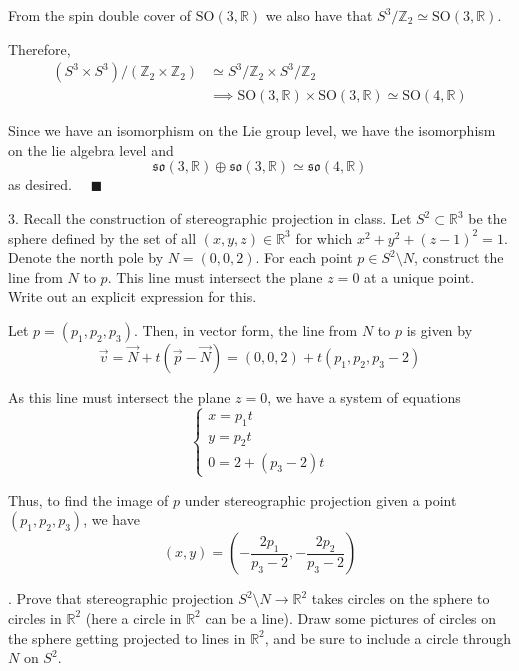 \documentclass[12pt]{article}
\newcommand{\Z}{\mathbb{Z}}
\newcommand{\R}{\mathbb{R}}
\newcommand{\SO}{\text{SO}}
\newcommand{\lra}{\longrightarrow}
\newcommand{\so}{\mathfrak{so}}
\newcommand{\qed}{\quad \blacksquare}
\begin{document}
        From the spin double cover of $\SO(3, \R)$ we also have that $S^3/\Z_2 \simeq \SO(3, \R)$. 

        Therefore, 
        \begin{align*}
            (S^3 \times S^3)/(\Z_2 \times \Z_2) &\simeq S^3/\Z_2 \times S^3/\Z_2 \\ 
            &\implies \SO(3, \R) \times \SO(3, \R) \simeq \SO(4, \R)
        \end{align*}        

        Since we have an isomorphism on the Lie group level, we have the isomorphism on the lie algebra level and 
        \[\so(3, \R) \oplus \so(3, \R) \simeq \so(4, \R)\]
        as desired. $\qed$
    \color{black}

\pagebreak 


3.  Recall the construction of stereographic projection in class.  Let $S^{2} \subset \R^{3}$ be the sphere defined by the set of all $(x,y,z) \in \R^{3}$ for which $x^{2} + y^{2} + (z-1)^{2} = 1$.  Denote the north pole by $N = (0,0,2)$.  For each point $p \in S^{2}\setminus N$, construct the line from $N$ to $p$.  This line must intersect the plane $z = 0$ at a unique point.  Write out an explicit expression for this. 

        \color{blue}
            Let $p = (p_1, p_2, p_3)$. Then, in vector form, the line from $N$ to $p$ is given by
            \[\vec v = \vec N + t(\vec p - \vec N) = (0, 0, 2) + t(p_1, p_2, p_3 - 2)\]

            As this line must intersect the plane $z = 0$, we have a system of equations 
            \[\begin{cases}
                x = p_1 t\\ 
                y = p_2 t\\ 
                0 = 2 + (p_3 - 2)t 
            \end{cases}\] 

            Thus, to find the image of $p$ under stereographic projection given a point $(p_1, p_2, p_3)$, we have 
            \[\boxed{(x, y) = \left(-\frac{2p_1}{p_3 - 2}, -\frac{2p_2}{p_3 - 2}\right)}\]
        \color{black}


.  Prove that stereographic projection $S^{2}\setminus N \lra \R^{2}$ takes circles on the sphere to circles in $\R^{2}$ (here a circle in $\R^{2}$ can be a line).  Draw some pictures of circles on the sphere getting projected to lines in $\R^{2}$, and be sure to include a circle through $N$ on $S^{2}$. 
\end{document}

